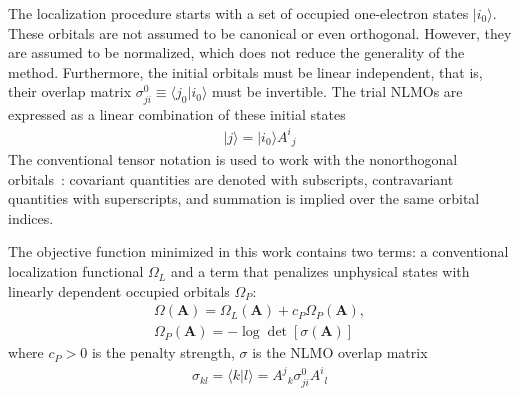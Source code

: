 \documentclass[aps,prl,reprint,amsmath,amssymb]{revtex4-1}
\newcommand{\ket}[1]{\ensuremath{\vert #1 \rangle}}
\newcommand{\braket}[2]{\ensuremath{\langle #1 \vert #2 \rangle}} %
\begin{document}
The localization procedure starts with a set of occupied one-electron states $\ket{i_0}$. 
These orbitals are not assumed to be canonical or even orthogonal. 
However, they are assumed to be normalized, which does not reduce the generality of the method. 
Furthermore, the initial orbitals must be linear independent, that is, their overlap matrix $\sigma_{ji}^0 \equiv \braket{j_0}{i_0}$ must be invertible. 
The trial NLMOs are expressed as a linear combination of these initial states
%
\begin{equation}
\begin{split}
\ket{j} = \ket{i_0} {A^i}_j  
\end{split}
\end{equation}
%
The conventional tensor notation is used to work with the nonorthogonal orbitals~\cite{head1998tensor}: covariant quantities are denoted with subscripts, contravariant quantities with superscripts, and summation is implied over the same orbital indices.

The objective function minimized in this work contains two terms: a conventional localization functional $\Omega_L$ and a term that penalizes unphysical states with linearly dependent occupied orbitals $\Omega_P$:
%
\begin{equation} \label{eq:fun-pen}
\begin{split}
\Omega(\mathbf{A}) = \Omega_L(\mathbf{A}) + c_P \Omega_P(\mathbf{A}), \\
\Omega_P(\mathbf{A}) = - \log \det \left[ \sigma (\mathbf{A}) \right]
\end{split}
\end{equation}
%
where $c_P > 0$ is the penalty strength, $\sigma$ is the NLMO overlap matrix 
%
\begin{equation}
\begin{split}
\sigma_{kl} = \braket{k}{l} = {A^j}_k \sigma_{ji}^0{A^i}_l
\end{split}
\end{equation}
%
\end{document}
